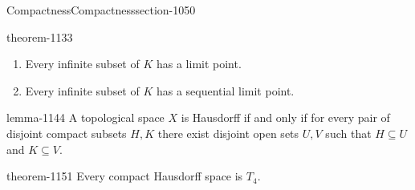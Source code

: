 \documentclass[oneside,10pt,]{article}
\begin{document}
\begin{sectionptx}{Compactness}{}{Compactness}{}{}{section-1050}
\begin{theorem}{}{}{theorem-1133}
\begin{enumerate}
\item\hypertarget{li-1140}{}Every infinite subset of \(K\) has a limit point.%
\item\hypertarget{li-1142}{}Every infinite subset of \(K\) has a sequential limit point.%
\end{enumerate}
\end{theorem}
\begin{lemma}{}{}{lemma-1144}%
\hypertarget{p-1145}{}%
A topological space \(X\) is Hausdorff if and only if for every pair of disjoint compact subsets \(H,K\) there exist disjoint open sets \(U,V\) such that \(H\subseteq U\) and \(K\subseteq V\).%
\end{lemma}
\begin{theorem}{}{}{theorem-1151}%
\hypertarget{p-1152}{}%
Every compact Hausdorff space is \(T_4\).%
\end{theorem}
\end{sectionptx}
%
%
\typeout{************************************************}
\typeout{************************************************}
%
\end{document}
